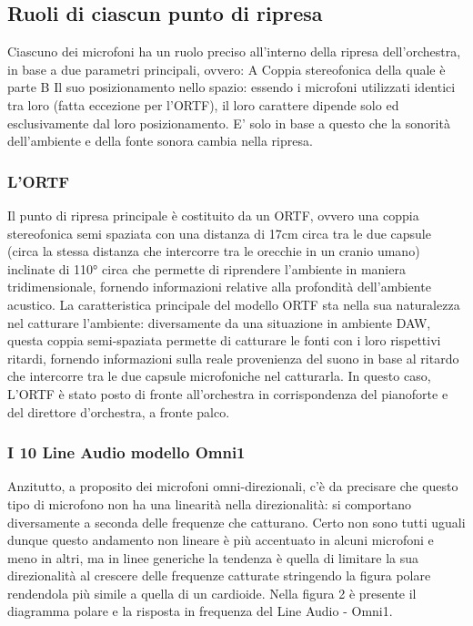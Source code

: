 \subsection*{Ruoli di ciascun punto di ripresa}
Ciascuno dei microfoni ha un ruolo preciso all'interno della ripresa dell'orchestra, in base a due parametri principali, ovvero:
A Coppia stereofonica della quale è parte
B Il suo posizionamento nello spazio: essendo i microfoni utilizzati identici tra loro (fatta eccezione per l'ORTF), il loro carattere dipende solo ed esclusivamente dal loro posizionamento. E' solo in base a questo che la sonorità dell'ambiente e della fonte sonora cambia nella ripresa.

\subsubsection{L'ORTF}
Il punto di ripresa principale è costituito da un ORTF, ovvero una coppia stereofonica semi spaziata con una distanza di 17cm circa tra le due capsule (circa la stessa distanza che intercorre tra le orecchie in un cranio umano) inclinate di 110° circa che permette di riprendere l'ambiente in maniera tridimensionale, fornendo informazioni relative alla profondità dell'ambiente acustico.
La caratteristica principale del modello ORTF sta nella sua naturalezza nel catturare l'ambiente: diversamente da una situazione in ambiente DAW, questa coppia semi-spaziata permette di catturare le fonti con i loro rispettivi ritardi, fornendo informazioni sulla reale provenienza del suono in base al ritardo che intercorre tra le due capsule microfoniche nel catturarla.
In questo caso, L'ORTF è stato posto di fronte all'orchestra in corrispondenza del pianoforte e del direttore d'orchestra, a fronte palco.

\subsubsection {I 10 Line Audio modello Omni1}
Anzitutto, a proposito dei microfoni omni-direzionali, c'è da precisare che questo tipo di microfono non ha una linearità nella direzionalità: si comportano diversamente a seconda delle frequenze che catturano. Certo non sono tutti uguali dunque questo andamento non lineare è più accentuato in alcuni microfoni e meno in altri, ma in linee generiche la tendenza è quella di limitare la sua direzionalità al crescere delle frequenze catturate stringendo la figura polare rendendola più simile a quella di un cardioide. Nella figura 2 è presente il diagramma polare e la risposta in frequenza del Line Audio - Omni1.


